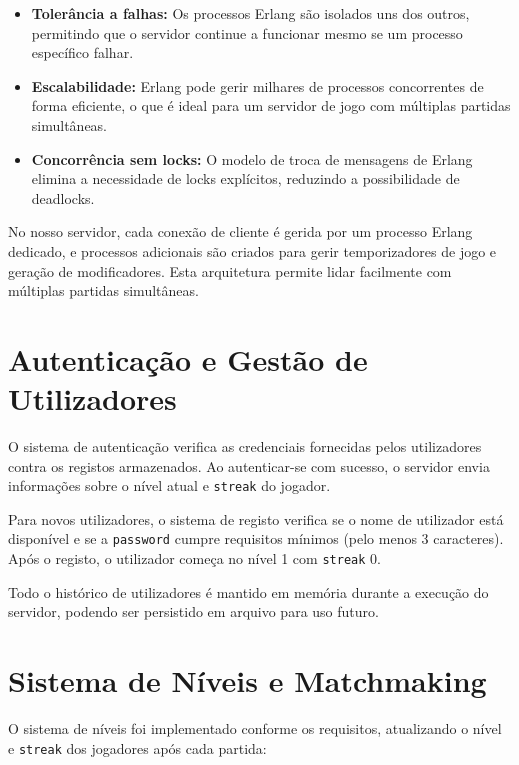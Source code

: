 \documentclass[12pt,a4paper]{report}
\begin{document}
\begin{itemize}
    \item \textbf{Tolerância a falhas:} Os processos Erlang são isolados uns dos outros, permitindo que o servidor continue a funcionar mesmo se um processo específico falhar.
    
    \item \textbf{Escalabilidade:} Erlang pode gerir milhares de processos concorrentes de forma eficiente, o que é ideal para um servidor de jogo com múltiplas partidas simultâneas.
    
    \item \textbf{Concorrência sem locks:} O modelo de troca de mensagens de Erlang elimina a necessidade de locks explícitos, reduzindo a possibilidade de deadlocks.
\end{itemize}

No nosso servidor, cada conexão de cliente é gerida por um processo Erlang dedicado, e processos adicionais são criados para gerir temporizadores de jogo e geração de modificadores. Esta arquitetura permite lidar facilmente com múltiplas partidas simultâneas.

\section{Autenticação e Gestão de Utilizadores}

O sistema de autenticação verifica as credenciais fornecidas pelos utilizadores contra os registos armazenados. Ao autenticar-se com sucesso, o servidor envia informações sobre o nível atual e \texttt{streak} do jogador.

Para novos utilizadores, o sistema de registo verifica se o nome de utilizador está disponível e se a \texttt{password} cumpre requisitos mínimos (pelo menos 3 caracteres). Após o registo, o utilizador começa no nível 1 com \texttt{streak} 0.

Todo o histórico de utilizadores é mantido em memória durante a execução do servidor, podendo ser persistido em arquivo para uso futuro.

\section{Sistema de Níveis e Matchmaking}

O sistema de níveis foi implementado conforme os requisitos, atualizando o nível e \texttt{streak} dos jogadores após cada partida:
\end{document}
